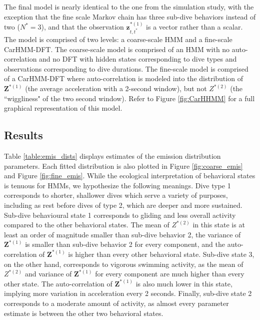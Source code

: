 The final model is nearly identical to the one from the simulation study, with the exception that the fine scale Markov chain has three sub-dive behaviors instead of two ($N^* = 3$), and that the observation $\mathbf{z}^{*(1)}_{t,t^*}$ is a vector rather than a scalar. The model is comprised of two levels: a coarse-scale HMM and a fine-scale CarHMM-DFT. The coarse-scale model is comprised of an HMM with no auto-correlation and no DFT with hidden states corresponding to dive types and observations corresponding to dive durations. The fine-scale model is comprised of a CarHMM-DFT where auto-correlation is modeled into the distribution of $\mathbf{Z}^{*(1)}$ (the average acceleration with a 2-second window), but not $Z^{*(2)}$ (the ``wiggliness" of the two second window). Refer to Figure \ref{fig:CarHHMM} for a full graphical representation of this model.

\subsection{Results}

Table \ref{table:emis_dists} displays estimates of the emission distribution parameters. Each fitted distribution is also plotted in Figure \ref{fig:coarse_emis} and Figure \ref{fig:fine_emis}. While the ecological interpretation of behavioral states is tenuous for HMMs, we hypothesize the following meanings. Dive type 1 corresponds to shorter, shallower dives which serve a variety of purposes, including as rest before dives of type 2, which are deeper and more sustained. Sub-dive behavioural state 1 corresponds to gliding and less overall activity compared to the other behavioral states. The mean of $Z^{*(2)}$ in this state is at least an order of magnitude smaller than sub-dive behavior 2, the variance of $\mathbf{Z}^{*(1)}$ is smaller than sub-dive behavior 2 for every component, and the auto-correlation of $\mathbf{Z}^{*(1)}$ is higher than every other behavioral state. Sub-dive state 3, on the other hand, corresponds to vigorous swimming activity, as the mean of $Z^{*(2)}$ and variance of $\mathbf{Z}^{*(1)}$ for every component are much higher than every other state. The auto-correlation of $\mathbf{Z}^{*(1)}$ is also much lower in this state, implying more variation in acceleration every 2 seconds. Finally, sub-dive state 2 corresponds to a moderate amount of activity, as almost every parameter estimate is between the other two behavioral states.

